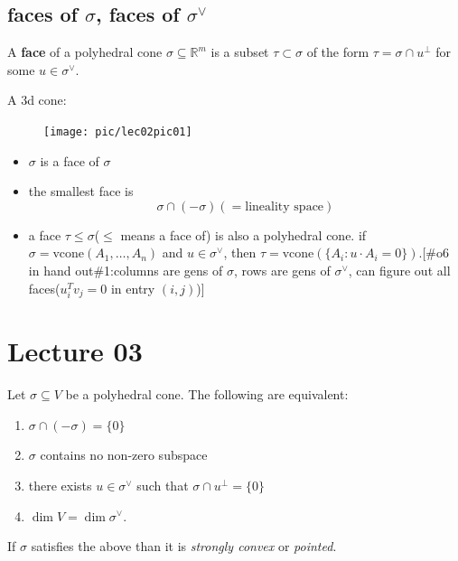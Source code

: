 \documentclass[a4paper,12pt]{amsart}
\newcommand{\RR}{\mathbb{R}}
\begin{document}
\subsection{faces of $\sigma$, faces of $\sigma^{\vee}$}
\begin{Def}
A \textbf{face} of a polyhedral cone $\sigma\subseteq\RR^m$ is a subset $\tau\subset\sigma$ of the form $\tau=\sigma\cap u^{\perp}$ for some $u\in\sigma^{\vee}$.
\end{Def}
\begin{Eg}A 3d cone:
\begin{figure}[h]
	\centering
	\texttt{[image: pic/lec02pic01]}
\end{figure}
\end{Eg}
\begin{Remark}
\begin{itemize}
\item $\sigma$ is a face of $\sigma$
\item the smallest face is
\begin{equation*}
\sigma\cap(-\sigma)(=\text{lineality space})
\end{equation*}
\item a face $\tau\leq\sigma$($\leq$ means a face of) is also a polyhedral cone. if $\sigma=\text{vcone}(A_1,\dots, A_n)$ and $u\in\sigma^{\vee}$, then $\tau=\text{vcone}(\{A_i:u\cdot A_i=0\})$.[\#o6 in hand out\#1:columns are gens of $\sigma$, rows are gens of $\sigma^{\vee}$, can figure out all faces($u_i^Tv_j=0$ in entry $(i,j)$)]
\end{itemize}
\end{Remark}

\newpage
\section{Lecture 03}

\begin{Def}
Let $\sigma \subseteq V$ be a polyhedral cone.
The following are equivalent:
\begin{enumerate}
\item $\sigma \cap (-\sigma) = \{0\}$
\item $\sigma$ contains no non-zero subspace
\item there exists $u \in \sigma^\vee$ such that $\sigma \cap u^\perp = \{0\}$
\item $\dim V = \dim \sigma^\vee$.
\end{enumerate}
If $\sigma$ satisfies the above than it is \emph{strongly convex} or \emph{pointed}.
\end{Def}
\end{document}
